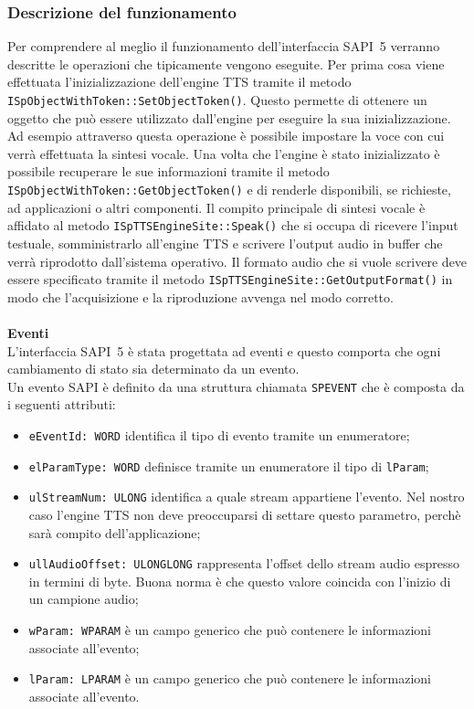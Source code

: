 	\subsubsection{Descrizione del funzionamento}
	Per comprendere al meglio il funzionamento dell'interfaccia SAPI~5 verranno descritte le operazioni che tipicamente vengono eseguite.
	Per prima cosa viene effettuata l'inizializzazione dell'engine TTS tramite il metodo \texttt{ISpObjectWithToken::SetObjectToken()}. Questo permette di ottenere un oggetto che può essere utilizzato dall'engine per eseguire la sua inizializzazione.
	Ad esempio attraverso questa operazione è possibile impostare la voce con cui verrà effettuata la sintesi vocale.
	Una volta che l'engine è stato inizializzato è possibile recuperare le sue informazioni tramite il metodo \texttt{ISpObjectWithToken::GetObjectToken()} e di renderle disponibili, se richieste, ad applicazioni o altri componenti.
	Il compito principale di sintesi vocale è affidato al metodo \texttt{ISpTTSEngineSite::Speak()} che si occupa di ricevere l'input testuale, somministrarlo all'engine TTS e scrivere l'output audio in buffer che verrà riprodotto dall'sistema operativo.
	Il formato audio che si vuole scrivere deve essere specificato tramite il metodo \texttt{ISpTTSEngineSite::GetOutputFormat()} in modo che l'acquisizione e la riproduzione avvenga nel modo corretto.\\\\
	\textbf{Eventi}\\
	L'interfaccia SAPI~5 è stata progettata ad eventi e questo comporta che ogni cambiamento di stato sia determinato da un evento.\\
	Un evento SAPI è definito da una struttura chiamata \texttt{SPEVENT} che è composta da i seguenti attributi:
	\begin{itemize}
		\item \texttt{eEventId: WORD} identifica il tipo di evento tramite un enumeratore;
		\item \texttt{elParamType: WORD} definisce tramite un enumeratore il tipo di \texttt{lParam};
		\item \texttt{ulStreamNum: ULONG} identifica a quale stream appartiene l'evento. Nel nostro caso l'engine TTS non deve preoccuparsi di settare questo parametro, perchè sarà compito dell'applicazione;
		\item \texttt{ullAudioOffset: ULONGLONG} rappresenta l'offset dello stream audio espresso in termini di byte. Buona norma è che questo valore coincida con l'inizio di un campione audio;
		\item \texttt{wParam: WPARAM} è un campo generico che può contenere le informazioni associate all'evento;
		\item \texttt{lParam: LPARAM} è un campo generico che può contenere le informazioni associate all'evento.
	\end{itemize}
